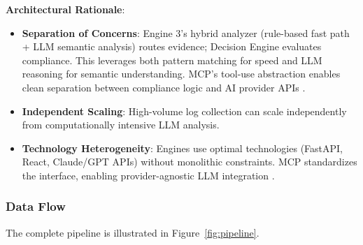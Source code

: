 \documentclass[11pt,conference]{IEEEtran}
\begin{document}
\textbf{Architectural Rationale}:
\begin{itemize}
    \item \textbf{Separation of Concerns}: Engine 3's hybrid analyzer (rule-based fast path + LLM semantic analysis) routes evidence; Decision Engine evaluates compliance. This leverages both pattern matching for speed and LLM reasoning for semantic understanding. MCP's tool-use abstraction enables clean separation between compliance logic and AI provider APIs \cite{mcp_enterprise}.
    \item \textbf{Independent Scaling}: High-volume log collection can scale independently from computationally intensive LLM analysis.
    \item \textbf{Technology Heterogeneity}: Engines use optimal technologies (FastAPI, React, Claude/GPT APIs) without monolithic constraints. MCP standardizes the interface, enabling provider-agnostic LLM integration \cite{mcp_spec}.
\end{itemize}

\subsubsection{Data Flow}

The complete pipeline is illustrated in Figure~\ref{fig:pipeline}.
\end{document}
